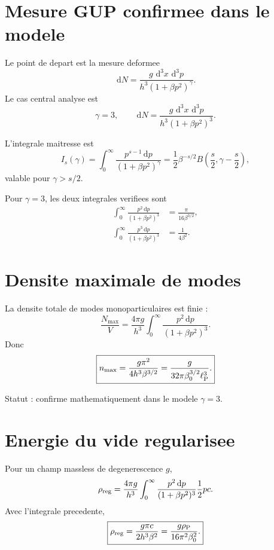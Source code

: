 \documentclass[11pt,a4paper]{article}
\newcommand{\dd}{\,\mathrm d}
\newcommand{\lp}{\ell_{\rm P}}
\newcommand{\rhoP}{\rho_{\rm P}}
\newcommand{\rhoReg}{\rho_{\rm reg}}
\begin{document}
\section{Mesure GUP confirmee dans le modele}

Le point de depart est la mesure deformee
\begin{equation}
\dd N
=
\frac{g\,\dd^3x\,\dd^3p}
{h^3(1+\beta p^2)^\gamma}.
\end{equation}
Le cas central analyse est
\begin{equation}
\gamma=3,
\qquad
\dd N
=
\frac{g\,\dd^3x\,\dd^3p}
{h^3(1+\beta p^2)^3}.
\label{eq:gup_measure}
\end{equation}

L'integrale maitresse est
\begin{equation}
I_s(\gamma)=
\int_0^\infty
\frac{p^{s-1}\dd p}{(1+\beta p^2)^\gamma}
=
\frac12\beta^{-s/2}
B\left(\frac{s}{2},\gamma-\frac{s}{2}\right),
\end{equation}
valable pour $\gamma>s/2$.

Pour $\gamma=3$, les deux integrales verifiees sont
\begin{align}
\int_0^\infty\frac{p^2\dd p}{(1+\beta p^2)^3}
&=
\frac{\pi}{16\beta^{3/2}},\\
\int_0^\infty\frac{p^3\dd p}{(1+\beta p^2)^3}
&=
\frac{1}{4\beta^2}.
\end{align}

\section{Densite maximale de modes}

La densite totale de modes monoparticulaires est finie :
\begin{equation}
\frac{N_{\max}}{V}
=
\frac{4\pi g}{h^3}
\int_0^\infty
\frac{p^2\dd p}{(1+\beta p^2)^3}.
\end{equation}
Donc
\begin{equation}
\boxed{
n_{\max}
=
\frac{g\pi^2}{4h^3\beta^{3/2}}
=
\frac{g}{32\pi\beta_0^{3/2}\lp^3}.
}
\label{eq:nmax}
\end{equation}

Statut : confirme mathematiquement dans le modele $\gamma=3$.

\section{Energie du vide regularisee}

Pour un champ massless de degenerescence $g$,
\begin{equation}
\rhoReg
=
\frac{4\pi g}{h^3}
\int_0^\infty
\frac{p^2\dd p}{(1+\beta p^2)^3}
\frac12pc.
\end{equation}
Avec l'integrale precedente,
\begin{equation}
\boxed{
\rhoReg
=
\frac{g\pi c}{2h^3\beta^2}
=
\frac{g\rhoP}{16\pi^2\beta_0^2}.
}
\label{eq:rho_reg}
\end{equation}
\end{document}
